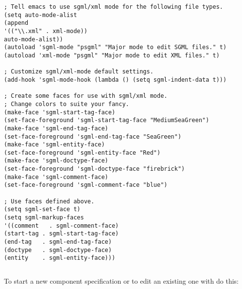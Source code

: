 \documentclass[11pt]{article}
\begin{document}
\begin{verbatim}
; Tell emacs to use sgml/xml mode for the following file types.
(setq auto-mode-alist
(append
'(("\\.xml" . xml-mode))
auto-mode-alist))
(autoload 'sgml-mode "psgml" "Major mode to edit SGML files." t)
(autoload 'xml-mode "psgml" "Major mode to edit XML files." t) 

; Customize sgml/xml-mode default settings.
(add-hook 'sgml-mode-hook (lambda () (setq sgml-indent-data t)))

; Create some faces for use with sgml/xml mode.
; Change colors to suite your fancy.
(make-face 'sgml-start-tag-face) 
(set-face-foreground 'sgml-start-tag-face "MediumSeaGreen") 
(make-face 'sgml-end-tag-face) 
(set-face-foreground 'sgml-end-tag-face "SeaGreen") 
(make-face 'sgml-entity-face) 
(set-face-foreground 'sgml-entity-face "Red") 
(make-face 'sgml-doctype-face) 
(set-face-foreground 'sgml-doctype-face "firebrick") 
(make-face 'sgml-comment-face) 
(set-face-foreground 'sgml-comment-face "blue") 

; Use faces defined above.
(setq sgml-set-face t)
(setq sgml-markup-faces 
'((comment   . sgml-comment-face) 
(start-tag . sgml-start-tag-face) 
(end-tag   . sgml-end-tag-face) 
(doctype   . sgml-doctype-face) 
(entity    . sgml-entity-face))) 
\end{verbatim}

\subsection{\SUBSECgettingStarted}
\label{\SUBSECgettingStarted}

To start a new component specification or to edit an existing one with
\emacs{} do this:
\end{document}
